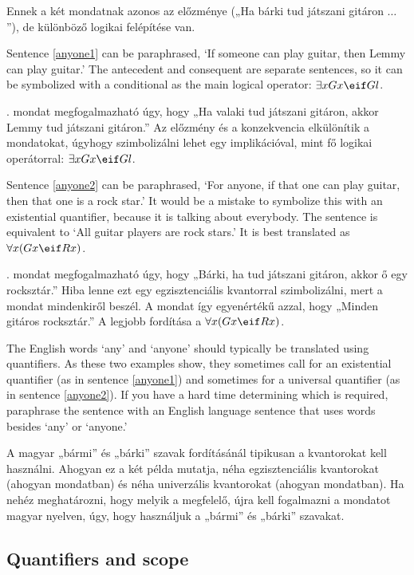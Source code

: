 Ennek a két mondatnak azonos az előzménye („Ha bárki tud játszani gitáron $\ldots$”), de különböző logikai felépítése van.


Sentence \ref{anyone1} can be paraphrased, `If someone can play guitar, then Lemmy can play guitar.' The antecedent and consequent are separate sentences, so it can be symbolized with a conditional as the main logical operator: $\exists x Gx \eif Gl$.

. mondat megfogalmazható úgy, hogy „Ha valaki tud játszani gitáron, akkor Lemmy tud játszani gitáron.” Az előzmény és a konzekvencia elkülönítik a mondatokat, úgyhogy szimbolizálni lehet egy implikációval, mint fő logikai operátorral: $\exists x Gx \eif Gl$.


Sentence \ref{anyone2} can be paraphrased, `For anyone, if that one can play guitar, then that one is a rock star.' It would be a mistake to symbolize this with an existential quantifier, because it is talking about everybody. The sentence is equivalent to `All guitar players are rock stars.' It is best translated as $\forall x(Gx \eif Rx)$.

. mondat megfogalmazható úgy, hogy „Bárki, ha tud játszani gitáron, akkor ő egy rocksztár.” Hiba lenne ezt egy egzisztenciális kvantorral szimbolizálni, mert a mondat mindenkiről beszél. A mondat így egyenértékű azzal, hogy „Minden gitáros rocksztár.” A legjobb fordítása a $\forall x(Gx \eif Rx)$. 


The English words `any' and `anyone' should typically be translated using quantifiers. As these two examples show, they sometimes call for an existential quantifier (as in sentence \ref{anyone1}) and sometimes for a universal quantifier (as in sentence \ref{anyone2}). If you have a hard time determining which is required, paraphrase the sentence with an English language sentence that uses words besides `any' or `anyone.'

A magyar „bármi” és „bárki” szavak fordításánál tipikusan a kvantorokat kell használni. Ahogyan ez a két példa mutatja, néha egzisztenciális kvantorokat (ahogyan  mondatban) és néha univerzális kvantorokat (ahogyan  mondatban). Ha nehéz meghatározni, hogy melyik a megfelelő, újra kell fogalmazni a mondatot magyar nyelven, úgy, hogy használjuk a „bármi” és „bárki” szavakat. 


\subsection*{Quantifiers and scope}
